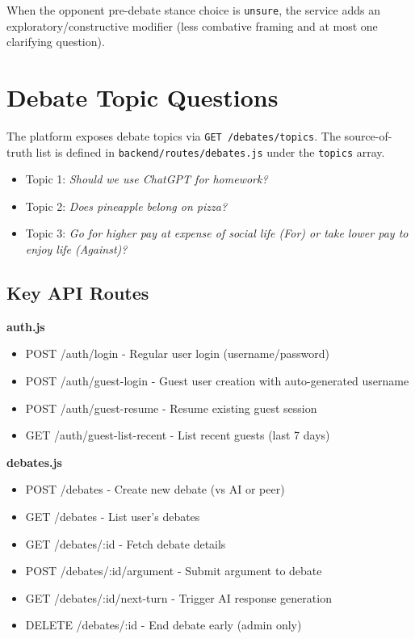 When the opponent pre-debate stance choice is \texttt{unsure}, the service adds
an exploratory/constructive modifier (less combative framing and at most one
clarifying question).

\section{Debate Topic Questions}
\label{sec:appendix_topic_questions}

The platform exposes debate topics via \texttt{GET /debates/topics}. The
source-of-truth list is defined in \texttt{backend/routes/debates.js} under the
\texttt{topics} array.

\begin{itemize}
    \item Topic 1: \textit{Should we use ChatGPT for homework?}
    \item Topic 2: \textit{Does pineapple belong on pizza?}
    \item Topic 3: \textit{Go for higher pay at expense of social life (For) or take lower pay to enjoy life (Against)?}
\end{itemize}

\subsection{Key API Routes}
\textbf{auth.js}
\begin{itemize}
    \item POST /auth/login - Regular user login (username/password)
    \item POST /auth/guest-login - Guest user creation with auto-generated username
    \item POST /auth/guest-resume - Resume existing guest session
    \item GET /auth/guest-list-recent - List recent guests (last 7 days)
\end{itemize}

\textbf{debates.js}
\begin{itemize}
    \item POST /debates - Create new debate (vs AI or peer)
    \item GET /debates - List user's debates
    \item GET /debates/:id - Fetch debate details
    \item POST /debates/:id/argument - Submit argument to debate
    \item GET /debates/:id/next-turn - Trigger AI response generation
    \item DELETE /debates/:id - End debate early (admin only)
\end{itemize}

